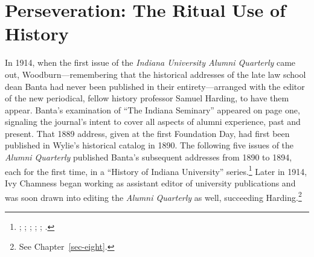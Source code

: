 \documentclass[
  american,
  letterpaper,
]{scrreprt}
\begin{document}
\section{Perseveration: The Ritual Use of
History}\label{perseveration-the-ritual-use-of-history}

In 1914, when the first issue of the \emph{Indiana University Alumni
Quarterly} came out, Woodburn---remembering that the historical
addresses of the late law school dean Banta had never been published in
their entirety---arranged with the editor of the new periodical, fellow
history professor Samuel Harding, to have them appear. Banta's
examination of ``The Indiana Seminary'' appeared on page one, signaling
the journal's intent to cover all aspects of alumni experience, past and
present. That 1889 address, given at the first Foundation Day, had first
been published in Wylie's historical catalog in 1890. The following five
issues of the \emph{Alumni Quarterly} published Banta's subsequent
addresses from 1890 to 1894, each for the first time, in a ``History of
Indiana University'' series.\footnote{;
  ; ; ; ;
  .} Later in 1914, Ivy Chamness began working as assistant editor
of university publications and was soon drawn into editing the
\emph{Alumni Quarterly} as well, succeeding Harding.\footnote{See
  Chapter~\ref{sec-eight}.}
\end{document}
